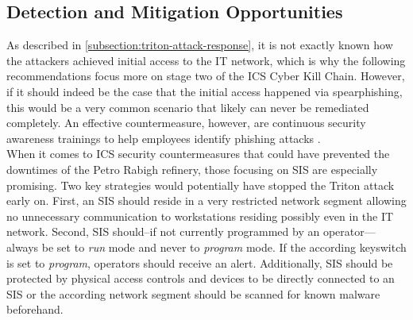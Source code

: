 \documentclass[runningheads]{llncs}
\begin{document}
\subsection{Detection and Mitigation Opportunities}
\label{subsection:triton-detection-mitigation}
As described in \autoref{subsection:triton-attack-response}, it is not exactly known how the attackers achieved initial access to the IT network, which is why the following recommendations focus more on stage two of the ICS Cyber Kill Chain.
However, if it should indeed be the case that the initial access happened via spearphishing, this would be a very common scenario that likely can never be remediated completely.
An effective countermeasure, however, are continuous security awareness trainings to help employees identify phishing attacks \cite{arachchilage.14}.\\
When it comes to ICS security countermeasures that could have prevented the downtimes of the Petro Rabigh refinery, those focusing on SIS are especially promising.
Two key strategies would potentially have stopped the Triton attack early on.
First, an SIS should reside in a very restricted network segment allowing no unnecessary communication to workstations residing possibly even in the IT network.
Second, SIS should--if not currently programmed by an operator---always be set to \textit{run} mode and never to \textit{program} mode.
If the according keyswitch is set to \textit{program}, operators should receive an alert.
Additionally, SIS should be protected by physical access controls and devices to be directly connected to an SIS or the according network segment should be scanned for known malware beforehand. \cite{dragos.17}
\end{document}
